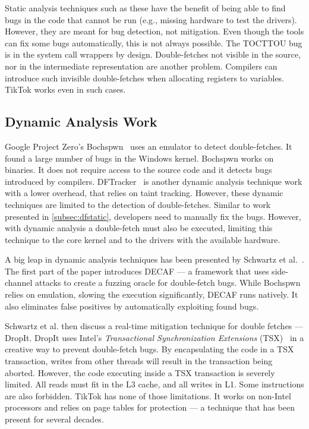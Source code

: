 \documentclass[conference]{IEEEtran}
\newcommand{\sysname}{TikTok}
\begin{document}
Static analysis techniques such as these have the benefit of being able to find
bugs in the code that cannot be run (e.g., missing hardware to test the
drivers). However, they are meant for bug detection, not mitigation. Even though
the tools can fix some bugs automatically, this is not always possible. The
TOCTTOU bug is in the system call wrappers by design. Double-fetches not visible
in the source, nor in the intermediate representation are another problem.
Compilers can introduce such invisible double-fetches when allocating registers
to variables. \sysname{} works even in such cases.


\subsection{Dynamic Analysis Work}
\label{subsec:dfdynamic}
Google Project Zero's Bochspwn~\cite{jurczyk2013bochspwn} uses an emulator to
detect double-fetches. It found a large number of bugs in the Windows kernel.
Bochspwn works on binaries. It does not require access to the source code and it
detects bugs introduced by compilers. DFTracker~\cite{wang2019dftracker} is
another dynamic analysis technique work with a lower overhead, that relies on
taint tracking. However, these dynamic techniques are limited to the detection
of double-fetches. Similar to work presented in \autoref{subsec:dfstatic},
developers need to manually fix the bugs. However, with dynamic analysis a
double-fetch must also be executed, limiting this technique to the core kernel
and to the drivers with the available hardware.

A big leap in dynamic analysis techniques has been presented by Schwartz et
al.~\cite{schwarz2018automated}. The first part of the paper introduces DECAF
--- a framework that uses side-channel attacks to create a fuzzing oracle for
double-fetch bugs. While Bochspwn relies on emulation, slowing the execution
significantly, DECAF runs natively. It also eliminates false positives by
automatically exploiting found bugs.

Schwartz et al. then discuss a real-time mitigation technique for double fetches
--- DropIt. DropIt uses Intel's \emph{Transactional Synchronization Extensions}
(TSX)~\cite{intel64and} in a creative way to prevent double-fetch bugs. By
encapsulating the code in a TSX transaction, writes from other threads will
result in the transaction being aborted. However, the code executing inside a
TSX transaction is severely limited. All reads must fit in the L3 cache, and all
writes in L1. Some instructions are also forbidden. \sysname{} has none of those
limitations. It works on non-Intel processors and relies on page tables for
protection --- a technique that has been present for several decades.
\end{document}

